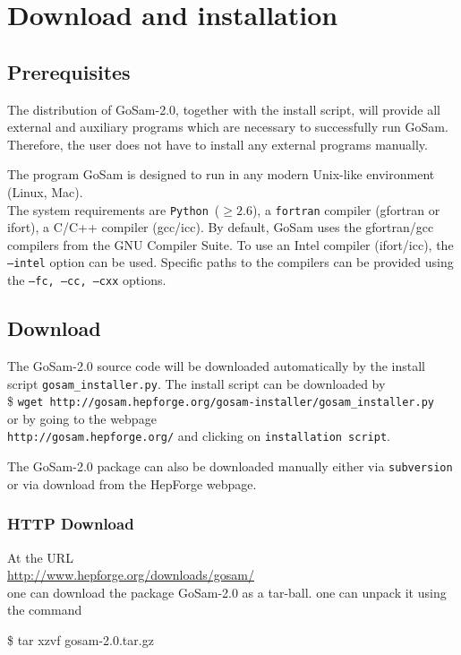 \documentclass[11pt,a4paper]{refrep}
\newcommand{\gosamversion}{{2{.}0}}
\newcommand{\gosam}{{\sc GoSam}\xspace}
\newcommand{\packagename}{{gosam-\gosamversion}}
\newcommand{\python}{{\tt Python}\xspace}
\begin{document}
\chapter{Download and installation}
\section{Prerequisites}

The distribution of \gosam-\gosamversion{}, together with the install script, 
will provide all external and auxiliary programs which are necessary 
to successfully run \gosam. 
Therefore, the user does not have to install any external programs manually.

The program \gosam is designed to run in any modern Unix-like environment (Linux, Mac).\\
The system requirements are
\python~($\geq2.6$), 
a {\tt fortran} compiler (gfortran or ifort), 
a C/C++ compiler (gcc/icc). 
By default, \gosam uses the gfortran/gcc  compilers from the GNU Compiler Suite.
To use an Intel compiler  (ifort/icc), the {\tt --intel} option can be used.
Specific paths to the compilers can be provided using the {\tt --fc, --cc, --cxx}  options.


\section{Download}

The \gosam-\gosamversion{} source code 
will be downloaded automatically by the install script {\tt gosam\_installer.py}. 
The install script can be downloaded by \\
{\$  \tt wget http://gosam.hepforge.org/gosam-installer/gosam\_installer.py}\\
or by going to the webpage \\
{\tt http://gosam.hepforge.org/}
and clicking on {\tt installation script}.



The \gosam-\gosamversion{} package can also be downloaded 
manually either via \texttt{subversion}
or via  download from the {\sc HepForge} webpage.

\subsection*{HTTP Download}
At the URL \\
\url{http://www.hepforge.org/downloads/gosam/}\\
one can download the package
\gosam-\gosamversion{}  as a tar-ball. 
one can unpack it using the command
\begin{example}
\$ tar xzvf \packagename{}.tar.gz
\end{example}
\end{document}
